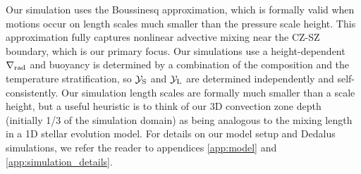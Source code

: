 Our simulation uses the Boussinesq approximation, which is formally valid when motions occur on length scales much smaller than the pressure scale height.
This approximation fully captures nonlinear advective mixing near the CZ-SZ boundary, which is our primary focus.
Our simulations use a height-dependent $\nabla_{\rm{rad}}$ and buoyancy is determined by a combination of the composition and the temperature stratification, so $\mathcal{Y}_{\rm{S}}$ and $\mathcal{Y}_{\rm{L}}$ are determined independently and self-consistently.
Our simulation length scales are formally much smaller than a scale height, but a useful heuristic is to think of our 3D convection zone depth (initially 1/3 of the simulation domain) as being analogous to the mixing length in a 1D stellar evolution model.
For details on our model setup and Dedalus \citep{burns_etal_2020} simulations, we refer the reader to appendices \ref{app:model} and \ref{app:simulation_details}.

